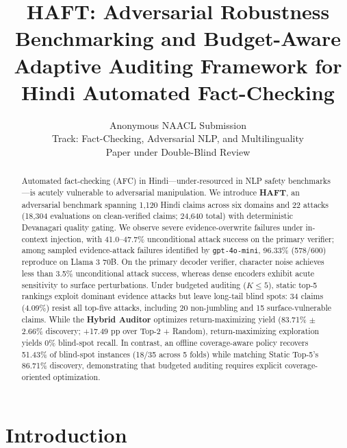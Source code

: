 \documentclass[11pt]{article}
\title{HAFT: Adversarial Robustness Benchmarking and Budget-Aware Adaptive Auditing Framework for Hindi Automated Fact-Checking}
\author{Anonymous NAACL Submission \\
  Track: Fact-Checking, Adversarial NLP, and Multilinguality \\
  Paper under Double-Blind Review}
\begin{document}
\maketitle

\begin{abstract}
Automated fact-checking (AFC) in Hindi---under-resourced in NLP safety benchmarks---is acutely vulnerable to adversarial manipulation. We introduce \textbf{HAFT}, an adversarial benchmark spanning 1,120 Hindi claims across six domains and 22 attacks (18,304 evaluations on clean-verified claims; 24,640 total) with deterministic Devanagari quality gating. We observe severe evidence-overwrite failures under in-context injection, with 41.0--47.7\% unconditional attack success on the primary verifier; among sampled evidence-attack failures identified by \texttt{gpt-4o-mini}, 96.33\% (578/600) reproduce on Llama 3 70B. On the primary decoder verifier, character noise achieves less than 3.5\% unconditional attack success, whereas dense encoders exhibit acute sensitivity to surface perturbations. Under budgeted auditing ($K \le 5$), static top-5 rankings exploit dominant evidence attacks but leave long-tail blind spots: 34 claims (4.09\%) resist all top-five attacks, including 20 non-jumbling and 15 surface-vulnerable claims. While the \textbf{Hybrid Auditor} optimizes return-maximizing yield (83.71\% $\pm$ 2.66\% discovery; +17.49 pp over Top-2 + Random), return-maximizing exploration yields 0\% blind-spot recall. In contrast, an offline coverage-aware policy recovers 51.43\% of blind-spot instances (18/35 across 5 folds) while matching Static Top-5's 86.71\% discovery, demonstrating that budgeted auditing requires explicit coverage-oriented optimization.
\end{abstract}

\section{Introduction}
\label{sec:intro}
\end{document}

